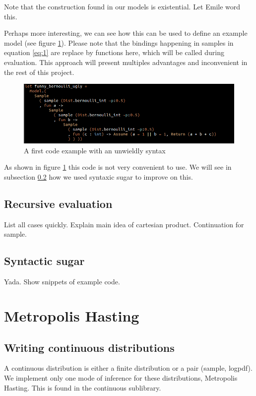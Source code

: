 \documentclass{article}
\newcommand\SC[1]{{\color{violet}{\it \bf Simon :} #1}}
\begin{document}
	
	Note that the construction found in our models is existential. \SC{Let Emile word this.}

	Perhaps more interesting, we can see how this can be used to define an example model (see figure \ref{fig:UglyEx}).
	Please note that the bindings happening in samples in equation \ref{eq:1} are replace by functions here, which will be called during evaluation.
	This approach will present multiples advantages and inconvenient in the rest of this project.

	\begin{figure}[h]
	  \centering
	  \includegraphics[scale=0.5]{images/ExampleUgly.png}
	  \caption{A first code example with an unwieldly syntax}
	  \label{fig:UglyEx}
	\end{figure}

	As shown in figure \ref{fig:UglyEx} this code is not very convenient to use. We will see in subsection \ref{subseq:sugar} how we used syntaxic sugar to improve on this.

	\subsection{Recursive evaluation}

	List all cases quickly. Explain main idea of cartesian product. Continuation for sample.	
	\subsection{Syntactic sugar}
	\label{subseq:sugar}

	Yada. Show snippets of example code.

\section{Metropolis Hasting}

	\subsection{Writing continuous distributions}

	A continuous distribution is either a finite distribution or a pair (sample, logpdf).
	We implement only one mode of inference for these distributions, Metropolis Hasting.
	This is found in the continuous sublibrary.
\end{document}
